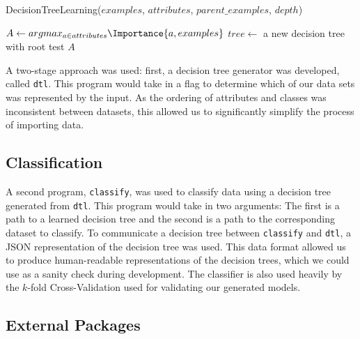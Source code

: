 \documentclass[screen, authorversion, nonacm, sigconf]{acmart}
\begin{document}
\begin{function}
	\SetAlgoLined
  \caption{DecisionTreeLearning($examples$, $attributes$, $parent\_examples$, $depth$)}
  \label{algo:DecisionTreeLearning}
  $A \gets argmax_{a \in attributes} \Importance{a, examples}$\;
  $tree \gets$ a new decision tree with root test $A$\;
  \;
\end{function}

A two-stage approach was used: first, a decision tree generator was developed, called \texttt{dtl}. This program would take in a flag to determine which of our data sets was represented by the input. As the ordering of attributes and classes was inconsistent between datasets, this allowed us to significantly simplify the process of importing data.

\subsection{Classification}

A second program, \texttt{classify}, was used to classify data using a decision tree generated from \texttt{dtl}. This program would take in two arguments: The first is a path to a learned decision tree and the second is a path to the corresponding dataset to classify. To communicate a decision tree between \texttt{classify} and \texttt{dtl}, a JSON representation of the decision tree was used. This data format allowed us to produce human-readable representations of the decision trees, which we could use as a sanity check during development. The classifier is also used heavily by the $k$-fold Cross-Validation used for validating our generated models.

\subsection{External Packages}
\end{document}
